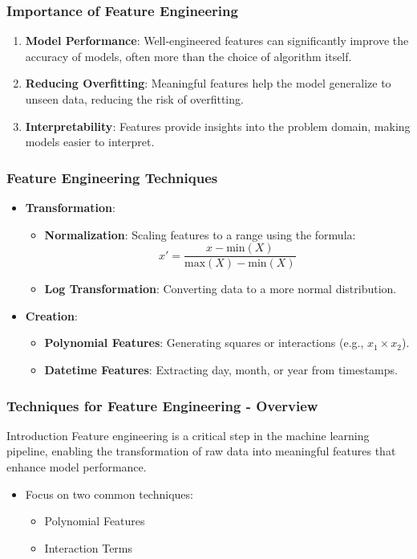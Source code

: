 \documentclass[aspectratio=169]{beamer}
\begin{document}
\begin{frame}[fragile]
    \frametitle{Importance of Feature Engineering}
    \begin{enumerate}
        \item \textbf{Model Performance}:
            Well-engineered features can significantly improve the accuracy of models, often more than the choice of algorithm itself.
        \item \textbf{Reducing Overfitting}:
            Meaningful features help the model generalize to unseen data, reducing the risk of overfitting.
        \item \textbf{Interpretability}:
            Features provide insights into the problem domain, making models easier to interpret.
    \end{enumerate}
\end{frame}

\begin{frame}[fragile]
    \frametitle{Feature Engineering Techniques}
    \begin{itemize}
        \item \textbf{Transformation}:
            \begin{itemize}
                \item \textbf{Normalization}: Scaling features to a range using the formula:
                \[
                x' = \frac{x - \text{min}(X)}{\text{max}(X) - \text{min}(X)}
                \]
                \item \textbf{Log Transformation}: Converting data to a more normal distribution.
            \end{itemize}
        \item \textbf{Creation}:
            \begin{itemize}
                \item \textbf{Polynomial Features}: Generating squares or interactions (e.g., \(x_1 \times x_2\)).
                \item \textbf{Datetime Features}: Extracting day, month, or year from timestamps.
            \end{itemize}
    \end{itemize}
\end{frame}

\begin{frame}[fragile]
    \frametitle{Techniques for Feature Engineering - Overview}
    \begin{block}{Introduction}
        Feature engineering is a critical step in the machine learning pipeline, enabling the transformation of raw data into meaningful features that enhance model performance. 
    \end{block}
    \begin{itemize}
        \item Focus on two common techniques: 
        \begin{itemize}
            \item Polynomial Features
            \item Interaction Terms
        \end{itemize}
    \end{itemize}
\end{frame}
\end{document}
